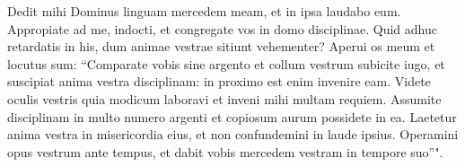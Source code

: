 \begin{biblechapter}
\verse Dedit mihi Dominus linguam mercedem meam, et in ipsa laudabo eum. 
\verse Appropiate ad me, indocti, et congregate vos in domo disciplinae. 
\verse Quid adhuc retardatis in his, dum animae vestrae sitiunt vehementer? 
\verse Aperui os meum et locutus sum: “Comparate vobis sine argento 
\verse et collum vestrum subicite iugo, et suscipiat anima vestra disciplinam: in proximo est enim invenire eam. 
\verse Videte oculis vestris quia modicum laboravi et inveni mihi multam requiem. 
\verse Assumite disciplinam in multo numero argenti et copiosum aurum possidete in ea. 
\verse Laetetur anima vestra in misericordia eius, et non confundemini in laude ipsius. 
\verse Operamini opus vestrum ante tempus, et dabit vobis mercedem vestram in tempore suo”".
\end{biblechapter}
